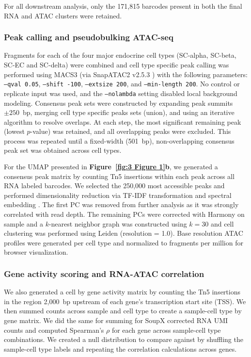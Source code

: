 For all downstream analysis, only the 171{,}815 barcodes present in both the final RNA and ATAC clusters were retained.

\subsubsection{Peak calling and pseudobulking ATAC-seq}
Fragments for each of the four major endocrine cell types (SC-alpha, SC-beta, SC-EC and SC-delta) were combined and cell type specific peak calling was performed using MACS3 \cite{Zhang2008-vm} (via SnapATAC2 v2.5.3 \cite{Zhang2024-kb}) with the following parameters: \texttt{--qval 0.05}, \texttt{--shift -100}, \texttt{--extsize 200}, and \texttt{--min-length 200}. No control or replicate input was used, and the \texttt{--nolambda} setting disabled local background modeling. Consensus peak sets were constructed by expanding peak summits $\pm 250$~bp, merging cell type specific peaks sets (union), and using an iterative algorithm to resolve overlaps. At each step, the most significant remaining peak (lowest $p$-value) was retained, and all overlapping peaks were excluded. This process was repeated until a fixed-width (501~bp), non-overlapping consensus peak set was obtained across cell types.

For the UMAP presented in \textbf{Figure~\ref{fig:3 Figure 1}b}, we generated a consensus peak matrix by counting Tn5 insertions within each peak across all RNA labeled barcodes. We selected the 250{,}000 most accessible peaks and performed dimensionality reduction via TF-IDF transformation and spectral embedding \cite{Zhang2024-kb}. The first PC was removed from further analysis as it was strongly correlated with read depth. The remaining PCs were corrected with Harmony on sample and a $k$-nearest neighbor graph was constructed using $k = 30$ and cell clustering was performed using Leiden (resolution = 1.0). Base resolution ATAC profiles were generated per cell type and normalized to fragments per million for browser visualization.

\subsubsection{Gene activity scoring and RNA-ATAC correlation}
We also generated a cell by gene activity matrix by counting the Tn5 insertions in the region 2{,}000~bp upstream of each gene’s transcription start site (TSS). We then summed counts across sample and cell type to create a sample-cell type by gene matrix. We did the same for summing for SoupX corrected RNA UMI counts and computed Spearman’s $\rho$ for each gene across sample-cell type combinations. We created a null distribution to compare against by shuffling the sample-cell type labels and repeating the correlation calculations across genes.

